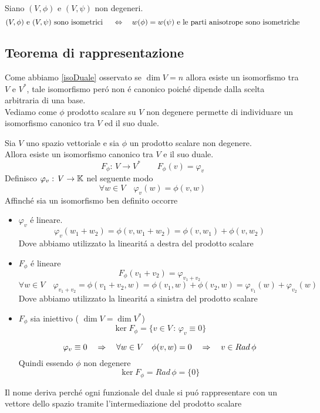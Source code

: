 \spazio
\begin{thm}Siano $(V,\phi) $ e $(V, \psi) $ non degeneri.\\
$$ (V,\phi) \text{ e } (V, \psi) \text{ sono isometrici } \quad \Leftrightarrow \quad w(\phi) = w(\psi) \text{ e le parti anisotrope sono isometriche}$$
\end{thm}
\newpage


\newpage


\subsection{Teorema di rappresentazione}

Come abbiamo \ref{isoDuale}
osservato se $\dim V= n $ allora esiste un isomorfismo  tra $V $ e $V^*$, tale isomorfismo per\'o non \'e canonico poich\'e dipende dalla scelta arbitraria di una base.\\
Vediamo come $\phi$ prodotto scalare su $V$ non degenere permette di individuare un isomorfismo canonico tra $V$ ed il suo duale.\\
\begin{thm}\bianco
Sia $V$ uno spazio vettoriale e sia $\phi$ un prodotto scalare non degenere.\\
Allora esiste un isomorfismo canonico tra $V$  e il suo duale.
\proof
$$ F_\phi: \, V \to V^* \qquad F_\phi(v) = \varphi_v $$
Definisco $\varphi_v :\, V \to \mathbb{K} $ nel seguente modo
$$ \forall w \in V \quad \varphi_v (w) = \phi(v,w) $$ 
Affinch\'e  sia un isomorfismo ben definito occorre
\begin{itemize}
\item $ \varphi_v $ \'e lineare.
$$\varphi_v(w_1+ w_2) = \phi(v,w_1+w_2) = \phi(v,w_1) + \phi(v,w_2) $$
Dove abbiamo utilizzato la linearit\'a a destra del prodotto scalare
\item $F_\phi$ \'e lineare
$$ F_\phi(v_1+v_2) = \varphi_{v_1+v_2} $$
$$\forall w \in V \quad \varphi_{v_1+ v_2}= \phi(v_1+ v_2, w) = \phi(v_1,w) + \phi(v_2,w) = \varphi_{v_1}(w) + \varphi_{v_2}(w)$$
Dove abbiamo utilizzato la linearit\'a a sinistra del prodotto scalare
\item $F_\phi$ sia iniettivo ( $\dim V = \dim V^*$)
$$ \ker F_\phi= \{ v \in V \, :\, \varphi_v \equiv 0 \} $$

$$ \varphi_v \equiv 0 \quad \Rightarrow \quad \forall w \in V \quad \phi(v,w) = 0 \quad \Rightarrow \quad v \in Rad \, \phi$$
Quindi essendo $\phi$ non degenere 
$$ \ker F_\phi = Rad\, \phi= \{ 0 \} $$
\end{itemize}
\endproof
\begin{oss}Il nome deriva perch\'e ogni funzionale del duale si pu\'o rappresentare con un vettore dello spazio tramite l'intermediazione del prodotto scalare 
\end{oss}
\end{thm}
\newpage


